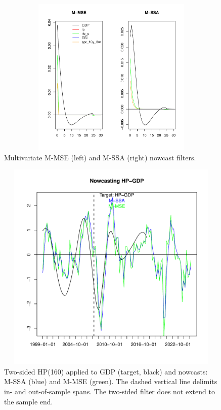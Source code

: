 \documentclass[a4paper]{article}
\begin{document}
\begin{figure}[H]\begin{center}\includegraphics[height=3in, width=5in]{./Figures/bk_gammak.pdf}\caption{Multivariate M-MSE (left) and M-SSA  (right) nowcast filters.\label{bk_gammak}}\end{center}\end{figure}\begin{figure}[H]\begin{center}\includegraphics[height=4in, width=5.5in]{./Figures/mssa_msse_now.pdf}\caption{Two-sided HP(160) applied to GDP (target, black) and nowcasts:  M-SSA (blue) and  M-MSE (green). The dashed vertical line delimits in- and out-of-sample spans. The two-sided filter does not extend to the sample end.\label{mssa_msse_now}}\end{center}\end{figure}%
\end{document}
